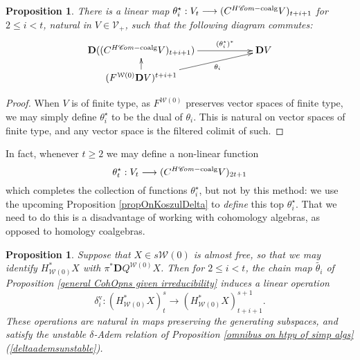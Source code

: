 \documentclass[11pt]{amsart} \renewcommand{\baselinestretch}{1.2}
\theoremstyle{plain}
\newtheorem{prop}[thm]{Proposition}
\numberwithin{equation}{section} %
\theoremstyle{plain}
\newtheorem{prop}[thm]{Proposition}
\numberwithin{equation}{chapter} %
\renewcommand{\to}{\longrightarrow}
\newcommand{\scrC}{\mathscr{C}}
\newcommand{\calV}{\mathcal{V}}
\newcommand{\calw}{\mathcal{W}}
\newcommand{\vect}[2]{\calV^{#1}_{#2}}
\newcommand{\HC}[1]{H#1\mathrm{-coalg}}
\newcommand{\ExtCohOp}{\mathrm{Sq}_\mathrm{ext}}
\newcommand{\algs}{{\scrC\!\textit{\normalfont\textit{om}}}}
\newcommand{\uver}{^\mathrm{v}}
\newcommand{\deltav}{\delta\uver}
\newcommand{\dual}{\mathbf{D}}
\begin{document}
\begin{Cohomology Operations for W and U}
\begin{prop}
\label{prop on thetaistar}
There is a linear map $\theta_i^\star:V_t\to (C^{\HC{\algs}}V)_{t+i+1}$ for $2\leq i<t$, natural in $V\in\vect{}{+}$, such that the following diagram commutes:
\[\xymatrix@R=4mm@C=20mm{
\dual((C^{\HC{\algs}}V)_{t+i+1})&%
\dual V\ar[l];[]^-{(\theta_i^\star)^*}
\\%
(F^{\calw(0)}\dual V)^{t+i+1}\ar[u]\ar[ur]_-{\theta_i}
}\]
\end{prop}
\begin{proof}
When $V$ is of finite type, as $F^{\calw(0)}$ preserves vector spaces of finite type, we may simply define $\theta_i^\star$ to be the dual of $\theta_i$. This is natural on vector spaces of finite type, and any vector space is the filtered colimit of such.
\end{proof}
In fact, whenever $t\geq2$ we may define a non-linear function
\[\theta_t^\star : V_t\to (C^{\HC{\algs}}V)_{2t+1}\]
which completes the collection of functions $\theta_i^\star$, but not by this method: we use the upcoming Proposition \ref{propOnKoszulDelta} to \emph{define} this top $\theta_i^\star$. That we need to do this is a disadvantage of working with cohomology algebras, as opposed to homology coalgebras.
\begin{prop}
\label{operations on goerss homology}
Suppose that $X\in s\calw(0)$ is almost free,
so that we may identify $H^*_{\calw(0)}X$ with $\pi^*\dual Q^{\calw(0)}X$. Then for $2\leq i <t$, the chain map $\widetilde{\theta_i}$ of Proposition \ref{general CohOpns given irreducibility} induces a linear operation
\[\deltav_i:(H^*_{\calw(0)}X)^{s}_t\to (H^*_{\calw(0)}X)^{s+1}_{t+i+1}.\] 
These operations are natural in maps preserving the generating subspaces, and satisfy the unstable $\delta$-Adem relation of Proposition \ref{omnibus on htpy of simp algs}\textit{(\ref{deltaademsunstable})}.


\end{prop}
\end{Cohomology Operations for W and U}
\end{document}
